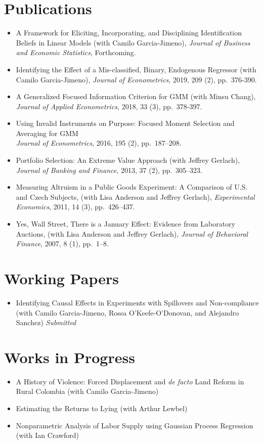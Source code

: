 \documentclass[line,overlapped]{myres}
\begin{document}
\begin{resume}
\section{\sc Publications}
\begin{itemize}
  \item A Framework for Eliciting, Incorporating, and Disciplining Identification Beliefs in Linear Models (with Camilo Garcia-Jimeno), \emph{Journal of Business and Economic Statistics}, Forthcoming.
  \item Identifying the Effect of a Mis-classified, Binary, Endogenous Regressor (with Camilo Garcia-Jimeno), \emph{Journal of Econometrics}, 2019, 209 (2), pp.\ 376-390.
  \item A Generalized Focused Information Criterion for GMM (with Minsu Chang), \emph{Journal of Applied Econometrics}, 2018, 33 (3), pp.\ 378-397.
  \item Using Invalid Instruments on Purpose: Focused Moment Selection and Averaging for GMM\\ \emph{Journal of Econometrics}, 2016, 195 (2), pp.\ 187--208.
	\item Portfolio Selection: An Extreme Value Approach (with Jeffrey Gerlach), \emph{Journal of Banking and Finance}, 2013, 37 (2), pp.\ 305--323.
	\item Measuring Altruism in a Public Goods Experiment:  A Comparison of U.S. and Czech Subjects, (with Lisa Anderson and Jeffrey Gerlach), \emph{Experimental Economics}, 2011, 14 (3), pp.\ 426--437.
	\item Yes, Wall Street, There is a January Effect: Evidence from Laboratory Auctions, (with Lisa Anderson and Jeffrey Gerlach), \emph{Journal of Behavioral Finance}, 2007, 8 (1), pp.\ 1--8. 
\end{itemize}


\section{\sc Working Papers}
\begin{itemize}
  \item Identifying Causal Effects in Experiments with Spillovers and Non-compliance (with Camilo Garcia-Jimeno, Rossa O'Keefe-O'Donovan, and Alejandro Sanchez) \emph{Submitted}
\end{itemize}


\section{\sc Works in Progress}
\begin{itemize}
  \item A History of Violence: Forced Displacement and \emph{de facto} Land Reform in Rural Colombia (with Camilo Garcia-Jimeno)
  \item Estimating the Returns to Lying (with Arthur Lewbel)
  \item Nonparametric Analysis of Labor Supply using Gaussian Process Regression (with Ian Crawford)
\end{itemize}


\end{resume}
\end{document}
